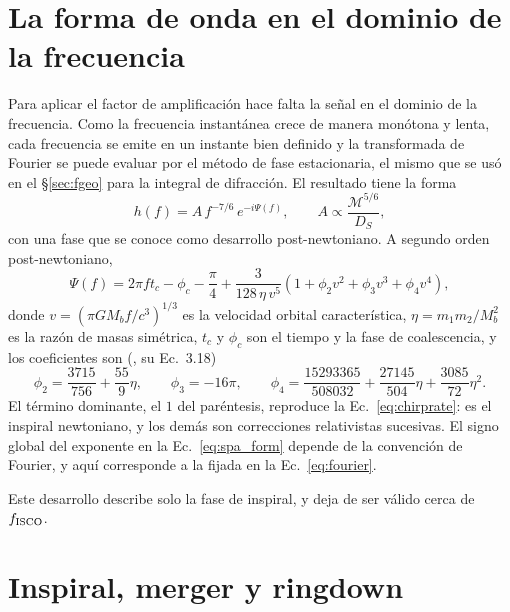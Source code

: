 \documentclass[11pt,a4paper,openany]{book}
\begin{document}
\section{La forma de onda en el dominio de la frecuencia}
\label{sec:taylorf2}

Para aplicar el factor de amplificaci\'on hace falta la se\~nal en el dominio
de la frecuencia. Como la frecuencia instant\'anea crece de manera mon\'otona
y lenta, cada frecuencia se emite en un instante bien definido y la
transformada de Fourier se puede evaluar por el m\'etodo de fase estacionaria,
el mismo que se us\'o en el \S\ref{sec:fgeo} para la integral de difracci\'on.
El resultado tiene la forma
\begin{equation}
  h(f)=A\,f^{-7/6}\,e^{-i\Psi(f)},
  \qquad
  A\propto\frac{\mathcal{M}^{5/6}}{D_S} ,
  \label{eq:spa_form}
\end{equation}
con una fase que se conoce como desarrollo post-newtoniano. A segundo orden
post-newtoniano,
\begin{equation}
  \Psi(f)=2\pi ft_c-\phi_c-\frac{\pi}{4}
  +\frac{3}{128\,\eta\,v^{5}}
  \left(1+\phi_2v^{2}+\phi_3v^{3}+\phi_4v^{4}\right) ,
  \label{eq:taylorf2phase}
\end{equation}
donde $v=(\pi G M_b f/c^{3})^{1/3}$ es la velocidad orbital caracter\'istica,
$\eta=m_1m_2/M_b^{2}$ es la raz\'on de masas sim\'etrica, $t_c$ y $\phi_c$ son
el tiempo y la fase de coalescencia, y los coeficientes son
(\citealp{BuonannoIyerOchsnerPanSathyaprakash2009}, su Ec.~3.18)
\begin{equation}
  \phi_2=\frac{3715}{756}+\frac{55}{9}\eta,
  \qquad
  \phi_3=-16\pi,
  \qquad
  \phi_4=\frac{15293365}{508032}+\frac{27145}{504}\eta+\frac{3085}{72}\eta^{2} .
  \label{eq:pn_coeffs}
\end{equation}
El t\'ermino dominante, el $1$ del par\'entesis, reproduce la
Ec.~\eqref{eq:chirprate}: es el inspiral newtoniano, y los dem\'as son
correcciones relativistas sucesivas. El signo global del exponente en la
Ec.~\eqref{eq:spa_form} depende de la convenci\'on de Fourier, y aqu\'i
corresponde a la fijada en la Ec.~\eqref{eq:fourier}.

Este desarrollo describe solo la fase de inspiral, y deja de ser v\'alido
cerca de $f_{\rm ISCO}$.

\section{Inspiral, merger y ringdown}
\label{sec:imr}
\end{document}
